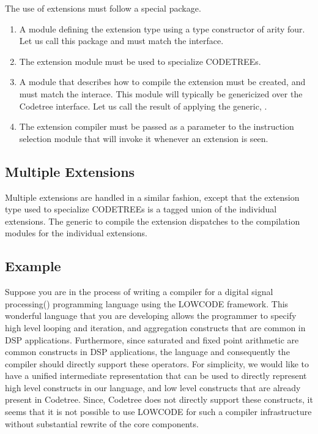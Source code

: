 The use of extensions must follow a special package. 
\begin{enumerate}
 \item A module defining the extension type using a type constructor
of arity four. Let us call this package  and must match
the  interface.
 \item The extension module must be used to specialize CODETREEs. 
 \item A module that describes how to compile the extension must be
created, and must match the  interace.
This module will typically be genericized over the Codetree interface.
Let us call the result of applying the generic, .
 \item The extension compiler must be passed as a parameter to the
instruction selection module that will invoke it whenever an extension 
is seen.
\end{enumerate}


\subsection{Multiple Extensions}

Multiple extensions are handled in a similar fashion, except that the
extension type used to specialize CODETREEs is a tagged union of the
individual extensions. The generic to compile the extension dispatches 
to the compilation modules for the individual extensions.

\subsection{Example}
Suppose you are in the process of writing a compiler for a digital
signal processing() programming language using the LOWCODE
framework.  This wonderful language that you are developing allows the
programmer to specify high level looping and iteration, and
aggregation constructs that are common in DSP applications.
Furthermore, since saturated and fixed point arithmetic are common
constructs in DSP applications, the language and consequently the
compiler should directly support these operators.  For simplicity, we
would like to have a unified intermediate representation that can be
used to directly represent high level constructs in our language, and
low level constructs that are already present in Codetree.  Since,
Codetree does not directly support these constructs, it seems that it is
not possible to use LOWCODE for such a compiler infrastructure without
substantial rewrite of the core components.

